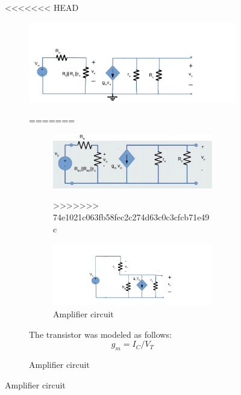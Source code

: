 \begin{figure} [!htb]
<<<<<<< HEAD
\begin{figure} [!htb] 
  \includegraphics[width=\linewidth]{incrementalgain.pdf}
  \caption{Amplifier circuit}
  \label{fig:theoplots}
  \endminipage\hfill
=======
\FloatBarrier
\begin{figure}
  \includegraphics{incremental_model.pdf}
  \caption{}
  \label{}
>>>>>>> 74e1021c063fb58fec2c274d63c0c3cfcb71e49c
\end{figure}

\begin{figure} [!htb] 
  \includegraphics[width=\linewidth]{incrementaloutput.pdf}
  \caption{Amplifier circuit}
  \label{fig:theoplots}
  \endminipage\hfill
\end{figure}

\FloatBarrier

The transistor was modeled as follows:\\

\begin{equation}
 g_{m} = I_{C}/V_{T}
 \label{}
\end{equation} 


\end{figure}
\end{figure}
